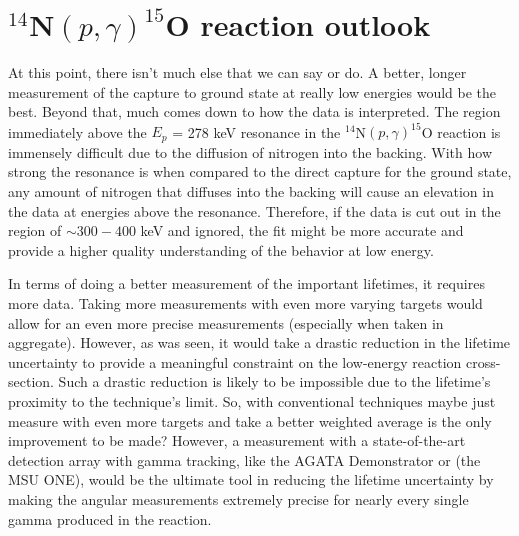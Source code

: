 \section{$^{14}$N$\left( p,\gamma \right) ^{15}$O reaction outlook}
\label{sec: outlook}

At this point, there isn't much else that we can say or do. A better, longer measurement of the capture to ground state at really low energies would be the best. Beyond that, much comes down to how the data is interpreted. The region immediately above the $E_{p}$ = 278 keV resonance in the $^{14}$N$\left( p,\gamma \right) ^{15}$O reaction is immensely difficult due to the diffusion of nitrogen into the backing. With how strong the resonance is when compared to the direct capture for the ground state, any amount of nitrogen that diffuses into the backing will cause an elevation in the data at energies above the resonance. Therefore, if the data is cut out in the region of $\sim 300 - 400$ keV and ignored, the fit might be more accurate and provide a higher quality understanding of the behavior at low energy. 

In terms of doing a better measurement of the important lifetimes, it requires more data. Taking more measurements with even more varying targets would allow for an even more precise measurements (especially when taken in aggregate). However, as was seen, it would take a drastic reduction in the lifetime uncertainty to provide a meaningful constraint on the low-energy reaction cross-section. Such a drastic reduction is likely to be impossible due to the lifetime's proximity to the technique's limit. So, with conventional techniques maybe just measure with even more targets and take a better weighted average is the only improvement to be made? However, a measurement with a state-of-the-art detection array with gamma tracking, like the AGATA Demonstrator or (the MSU ONE), would be the ultimate tool in reducing the lifetime uncertainty by making the angular measurements extremely precise for nearly every single gamma produced in the reaction. 



%
% 
% 
